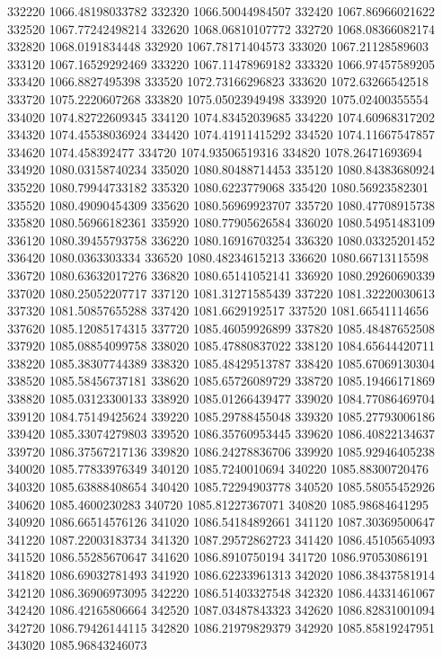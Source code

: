 {332220 1066.48198033782
332320 1066.50044984507
332420 1067.86966021622
332520 1067.77242498214
332620 1068.06810107772
332720 1068.08366082174
332820 1068.0191834448
332920 1067.78171404573
333020 1067.21128589603
333120 1067.16529292469
333220 1067.11478969182
333320 1066.97457589205
333420 1066.8827495398
333520 1072.73166296823
333620 1072.63266542518
333720 1075.2220607268
333820 1075.05023949498
333920 1075.02400355554
334020 1074.82722609345
334120 1074.83452039685
334220 1074.60968317202
334320 1074.45538036924
334420 1074.41911415292
334520 1074.11667547857
334620 1074.458392477
334720 1074.93506519316
334820 1078.26471693694
334920 1080.03158740234
335020 1080.80488714453
335120 1080.84383680924
335220 1080.79944733182
335320 1080.6223779068
335420 1080.56923582301
335520 1080.49090454309
335620 1080.56969923707
335720 1080.47708915738
335820 1080.56966182361
335920 1080.77905626584
336020 1080.54951483109
336120 1080.39455793758
336220 1080.16916703254
336320 1080.03325201452
336420 1080.0363303334
336520 1080.48234615213
336620 1080.66713115598
336720 1080.63632017276
336820 1080.65141052141
336920 1080.29260690339
337020 1080.25052207717
337120 1081.31271585439
337220 1081.32220030613
337320 1081.50857655288
337420 1081.6629192517
337520 1081.66541114656
337620 1085.12085174315
337720 1085.46059926899
337820 1085.48487652508
337920 1085.08854099758
338020 1085.47880837022
338120 1084.65644420711
338220 1085.38307744389
338320 1085.48429513787
338420 1085.67069130304
338520 1085.58456737181
338620 1085.65726089729
338720 1085.19466171869
338820 1085.03123300133
338920 1085.01266439477
339020 1084.77086469704
339120 1084.75149425624
339220 1085.29788455048
339320 1085.27793006186
339420 1085.33074279803
339520 1086.35760953445
339620 1086.40822134637
339720 1086.37567217136
339820 1086.24278836706
339920 1085.92946405238
340020 1085.77833976349
340120 1085.7240010694
340220 1085.88300720476
340320 1085.63888408654
340420 1085.72294903778
340520 1085.58055452926
340620 1085.4600230283
340720 1085.81227367071
340820 1085.98684641295
340920 1086.66514576126
341020 1086.54184892661
341120 1087.30369500647
341220 1087.22003183734
341320 1087.29572862723
341420 1086.45105654093
341520 1086.55285670647
341620 1086.8910750194
341720 1086.97053086191
341820 1086.69032781493
341920 1086.62233961313
342020 1086.38437581914
342120 1086.36906973095
342220 1086.51403327548
342320 1086.44331461067
342420 1086.42165806664
342520 1087.03487843323
342620 1086.82831001094
342720 1086.79426144115
342820 1086.21979829379
342920 1085.85819247951
343020 1085.96843246073
}
